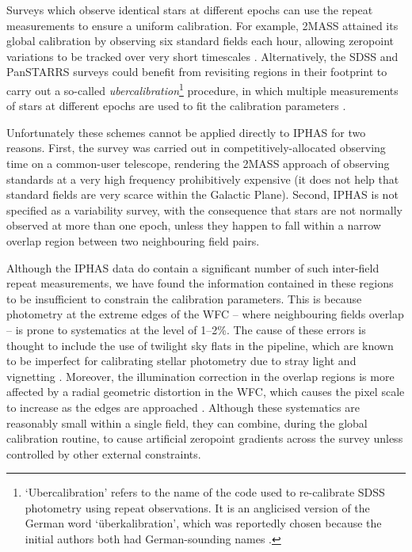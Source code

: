 \documentclass[useAMS,usenatbib]{mn2e}
\begin{document}
Surveys which observe identical stars at different epochs
can use the repeat measurements to ensure a uniform calibration.
For example, 2MASS attained its global calibration
by observing six standard fields each hour, 
allowing zeropoint variations to be tracked 
over very short timescales \citep{Nikolaev2000}.
Alternatively, the SDSS and PanSTARRS surveys could benefit
from revisiting regions in their footprint to 
carry out a so-called \emph{ubercalibration}\footnote{`Ubercalibration'
refers to the name of the code used to re-calibrate SDSS photometry
using repeat observations. 
It is an anglicised version of the German word `\"uberkalibration',
which was reportedly chosen because the initial authors both
had German-sounding names \citep{Finkbeiner2010}.} procedure,
in which multiple measurements of stars at different epochs
are used to fit the calibration parameters
\citep[e.g.][]{Ivezic2007,Padmanabhan2008,Schlafly2012}.

Unfortunately these schemes cannot be applied
directly to IPHAS
for two reasons. 
First, the survey was carried out 
in competitively-allocated observing time on a
common-user telescope, 
rendering the 2MASS approach 
of observing standards at a very high frequency
prohibitively expensive (it does not help that 
standard fields 
are very scarce within the Galactic Plane).
Second, IPHAS is not specified as a variability survey, with
the consequence that stars are not normally observed at more 
than one epoch,
unless they happen to fall within a narrow overlap region 
between two neighbouring field pairs.

Although the IPHAS data do contain a significant number of 
such inter-field repeat measurements,
we have found the information contained
in these regions to be insufficient
to constrain the calibration parameters.
This is because photometry at the extreme edges of the WFC
-- where neighbouring fields overlap -- 
is prone to systematics at the level of 1--2\%.
The cause of these errors is thought to include 
the use of twilight sky flats in the pipeline,
which are known to be imperfect for calibrating stellar photometry 
due to stray light and vignetting \citep[e.g.][]{Manfroid1995}.
Moreover, the illumination correction in the overlap regions
is more affected by a radial geometric distortion in the WFC,
which causes the pixel scale to increase as the edges 
are approached \citep{Gonzalez-Solares2011}.
Although these systematics are reasonably small within a single field,
they can combine, during the global calibration routine, to cause artificial zeropoint gradients 
across the survey unless controlled by other external constraints.
\end{document}
